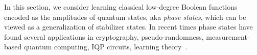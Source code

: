 \documentclass[11pt]{article}
\begin{document}
 In this section, we consider learning classical low-degree Boolean functions encoded as the amplitudes of quantum states, aka \emph{phase states}, which can be viewed as a generalization of stabilizer states. In recent times phase states have found several applications in cryptography, pseudo-randomness, measurement-based quantum computing, IQP circuits, learning theory~\cite{ji2018pseudorandom,brakerski2019pseudo,irani2021quantum,ananth2021cryptography,rossi2013quantum,takeuchi2019quantum,DBLP:journals/corr/abs-2208-07851}.
\end{document}
